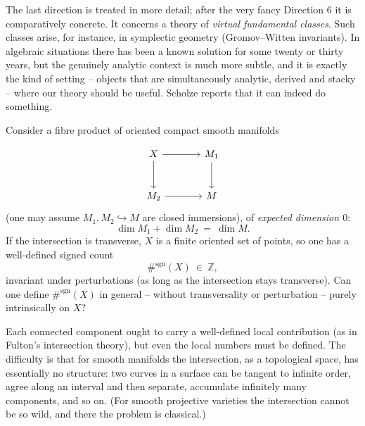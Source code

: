 The last direction is treated in more detail; after the very fancy Direction 6 it
is comparatively concrete. It concerns a theory of \emph{virtual fundamental
classes}. Such classes arise, for instance, in symplectic geometry (Gromov--Witten
invariants). In algebraic situations there has been a known solution for some
twenty or thirty years, but the genuinely analytic context is much more subtle,
and it is exactly the kind of setting -- objects that are simultaneously
analytic, derived and stacky -- where our theory should be useful. Scholze
reports that it can indeed do something.

\begin{question}
\label{q:24:signed-count}
Consider a fibre product of oriented compact smooth manifolds

\begin{equation}
\label{eq:24:fibre-product}
\begin{tikzcd}[column sep=large, row sep=large]
X \arrow[r] \arrow[d] & M_1 \arrow[d] \\
M_2 \arrow[r] & M
\end{tikzcd}
\end{equation}
(one may assume $M_1,M_2\hookrightarrow M$ are closed immersions), of
\emph{expected dimension $0$}:
\begin{equation*}
\dim M_1+\dim M_2\ =\ \dim M .
\end{equation*}
If the intersection is transverse, $X$ is a finite oriented set of points, so one
has a well-defined signed count
\begin{equation*}
\#^{\mathrm{sgn}}(X)\ \in\ \mathbb Z ,
\end{equation*}
invariant under perturbations (as long as the intersection stays transverse).
Can one define $\#^{\mathrm{sgn}}(X)$ in general -- without transversality or
perturbation -- purely intrinsically on $X$?
\end{question}

Each connected component ought to carry a well-defined local contribution (as in
Fulton's intersection theory), but even the local numbers must be defined. The
difficulty is that for smooth manifolds the intersection, as a topological space,
has essentially no structure: two curves in a surface can be tangent to infinite
order, agree along an interval and then separate, accumulate infinitely many
components, and so on. (For smooth projective varieties the intersection cannot be
so wild, and there the problem is classical.)

